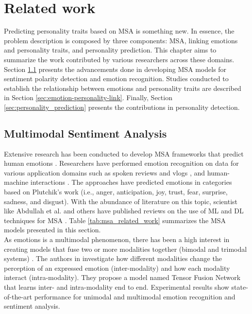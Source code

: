 \chapter{Related work}
\label{chap:related_work}
Predicting personality traits based on MSA is something new. In essence, the problem description is composed by three components: MSA, linking emotions and personality traits, and personality prediction. This chapter aims to summarize the work contributed by various researchers across these domains. Section \ref{sec:msa_related} presents the advancements done in developing MSA models for sentiment polarity detection and emotion recognition. Studies conducted to establish the relationship between emotions and personality traits are described in Section \ref{sec:emotion-personality-link}. Finally, Section \ref{sec:personality_prediction} presents the contributions in personality detection. 

\section{Multimodal Sentiment Analysis}
\label{sec:msa_related}
Extensive research has been conducted to develop MSA frameworks that predict human emotions \cite{sebe2005multimodal}. Researchers have performed emotion recognition on data for various application domains such as spoken reviews and vlogs \cite{wollmer2013youtube}, and human-machine interactions \cite{human_machine_langlet2015}. The approaches have predicted emotions in categories based on Plutchik's work (i.e., anger, anticipation, joy, trust, fear, surprise, sadness, and disgust). With the abundance of literature on this topic, scientist like Abdullah et al. \cite{DL_abdullah2021multimodal} and others \cite{sebe2005multimodal} \cite{MER_book_Sharma2021} have published reviews on the use of ML and DL techniques for MSA \cite{HP_RPP} \cite{HP_Advanced}. Table \ref{tab:msa_related_work} summarizes the MSA models presented in this section.  \\ 

As emotions is a multimodal phenomenon, there has been a high interest in creating models that fuse two or more modalities together (bimodal and trimodal systems) \cite{HP_Advanced}. The authors in \cite{tensor_fusion_network_2017} investigate how different modalities change the perception of an expressed emotion (inter-modality) and how each modality interact (intra-modality). They propose a model named Tensor Fusion Network that learns inter- and intra-modality end to end. Experimental results show state-of-the-art performance for unimodal and multimodal emotion recognition and sentiment analysis. \\


